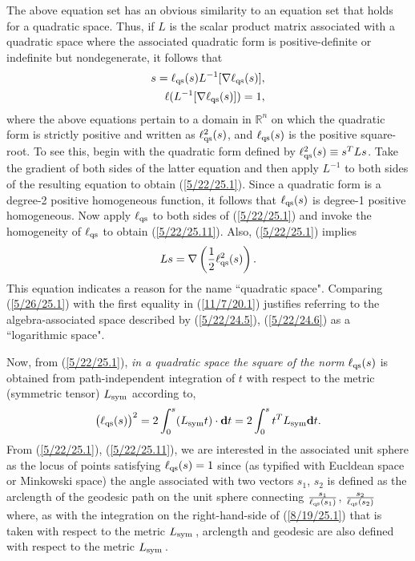 \documentclass{amsart}
\theoremstyle{definition}
\numberwithin{theorem}{section}
\numberwithin{equation}{section}
\begin{document}
The above equation set has an obvious similarity to an equation set that holds for a quadratic space. 
Thus, if $L$ is the scalar product matrix associated with a quadratic space where the associated quadratic form is positive-definite or indefinite but nondegenerate, it follows that
  \begin{eqnarray}\label{5/22/25.1} s = \ell_{\rm qs}(s) L^{-1}[\nabla \ell_{\rm qs}(s)],\\ \ell(L^{-1}[\nabla \ell_{\rm qs}(s)]) = 1, \label{5/22/25.11}\end{eqnarray} where the above equations pertain to a domain in $\mathbb{R}^n$ on which the quadratic form is strictly positive and written as $\ell_{\rm qs}^2(s)$, and $\ell_{\rm qs}(s)$ is the positive square-root.  To see this, begin with the quadratic form defined by $ \ell_{\rm qs}^2(s) \equiv s^TLs$.  Take the gradient of both sides of the latter equation and then apply $L^{-1}$ to both sides of the resulting equation to obtain (\ref{5/22/25.1}).  
  Since a quadratic form is a degree-2 positive homogeneous function, it follows that $\ell_{\rm qs}(s)$ is degree-1 positive homogeneous.  Now apply $\ell_{\rm qs}$ to both sides of  (\ref{5/22/25.1}) and invoke the homogeneity of $\ell_{\rm qs}$ to obtain (\ref{5/22/25.11}).      
Also, (\ref{5/22/25.1}) implies \begin{equation}\label{5/26/25.1} Ls = \nabla\left(\frac{1}{2}\ell_{\rm qs}^2(s)\right).\end{equation}  This equation indicates a reason for the name ``quadratic space".  Comparing (\ref{5/26/25.1}) with the first equality in (\ref{11/7/20.1}) justifies referring to the algebra-associated space described by (\ref{5/22/24.5}), (\ref{5/22/24.6}) as a ``logarithmic space".

Now, from (\ref{5/22/25.1}), {\it in a quadratic space the square of the norm} $\ell_{\rm qs}(s)$ is obtained from path-independent integration of $t$ with respect to the metric (symmetric tensor) $L_{\rm sym}$ according to, \begin{equation}\label{8/19/25.1} \big(\ell_{\rm qs}(s)\big)^2 = 2\int_0^s (L_{\rm sym}t)\cdot \mathbf{d}t =  2\int_0^s t^T L_{\rm sym} \mathbf{d}t.\end{equation}
From (\ref{5/22/25.1}), (\ref{5/22/25.11}), we are interested in the associated unit sphere as the locus of points satisfying $\ell_{\rm qs}(s)=1$ since (as typified with Eucldean space or Minkowski space) the angle associated with two vectors $s_1$, $s_2$ is defined as the arclength of the geodesic path on the unit sphere connecting $\frac{s_1}{\ell_{\rm qs}(s_1)}$, $\frac{s_2}{\ell_{\rm qs}(s_2)}$ where, as with the integration on the right-hand-side of (\ref{8/19/25.1}) that is taken with respect to the metric $L_{\rm sym}$\,, arclength and geodesic are also defined with respect to the metric $L_{\rm sym}$\,. 
\end{document}
